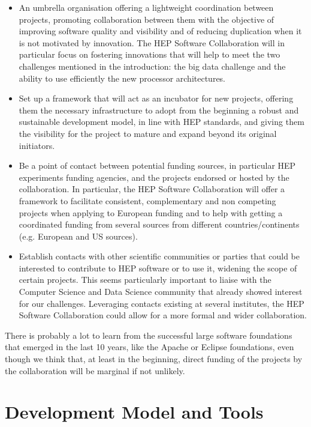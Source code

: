 \documentclass[11pt]{article} %
\begin{document}
\begin{itemize}
\item
An umbrella organisation offering a lightweight coordination between projects, promoting collaboration between them
with the objective of improving software quality and visibility and of reducing duplication when it is not motivated 
by innovation. The HEP Software Collaboration will in particular focus on fostering innovations that will help
to meet the two challenges mentioned in the introduction: the big data challenge and the ability to use efficiently
the new processor architectures.

\item
Set up a framework that will act as an incubator for new projects, offering them the necessary infrastructure
to adopt from the beginning a robust and sustainable development model, in line with HEP standards, and giving
them the visibility for the project to mature and expand beyond its original initiators.

\item
Be a point of contact between potential funding sources, in particular HEP experiments funding agencies, and the
projects endorsed or hosted by the collaboration. In particular, the HEP Software Collaboration will offer a
framework to facilitate consistent, complementary and non competing projects when applying to European funding
and to help with getting a coordinated funding from several sources from different countries/continents (e.g. European and US sources).

\item
Establish contacts with other scientific communities or parties that could be interested to contribute to HEP software
or to use it, widening the scope of certain projects. This seems particularly important to liaise with the Computer Science and Data Science
community that already showed interest for our challenges. Leveraging contacts existing at several institutes, the HEP
Software Collaboration could allow for a more formal and wider collaboration.

\end{itemize}

There is probably a lot to learn from the successful large software foundations that emerged in the last 10 years,
like the Apache or Eclipse foundations, even though we think that, at least in the beginning, direct funding of the
projects by the collaboration will be marginal if not unlikely.

\section{Development Model and Tools}
\end{document}
